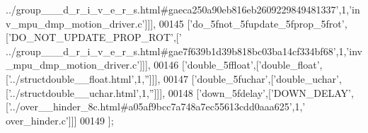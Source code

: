 \begin{DoxyCode}
{      ../group\_\_\_d\_r\_i\_v\_e\_r\_s.html#gaeca250a90eb816eb2609229849481337'},1,\textcolor{stringliteral}{'inv\_mpu\_dmp\_motion\_driver.c'}]]],
00145   [\textcolor{stringliteral}{'do\_5fnot\_5fupdate\_5fprop\_5frot'},[\textcolor{stringliteral}{'DO\_NOT\_UPDATE\_PROP\_ROT'},[\textcolor{stringliteral}{'
      ../group\_\_\_d\_r\_i\_v\_e\_r\_s.html#gae7f639b1d39b818bc03ba14cf334bf68'},1,\textcolor{stringliteral}{'inv\_mpu\_dmp\_motion\_driver.c'}]]],
00146   [\textcolor{stringliteral}{'double\_5ffloat'},[\textcolor{stringliteral}{'double\_float'},[\textcolor{stringliteral}{'../structdouble\_\_float.html'},1,\textcolor{stringliteral}{''}]]],
00147   [\textcolor{stringliteral}{'double\_5fuchar'},[\textcolor{stringliteral}{'double\_uchar'},[\textcolor{stringliteral}{'../structdouble\_\_uchar.html'},1,\textcolor{stringliteral}{''}]]],
00148   [\textcolor{stringliteral}{'down\_5fdelay'},[\textcolor{stringliteral}{'DOWN\_DELAY'},[\textcolor{stringliteral}{'../over\_\_hinder\_8c.html#a05af9bcc7a748a7ec55613cdd0aaa625'},1,\textcolor{stringliteral}{'
      over\_hinder.c'}]]]
00149 ];
\end{DoxyCode}
